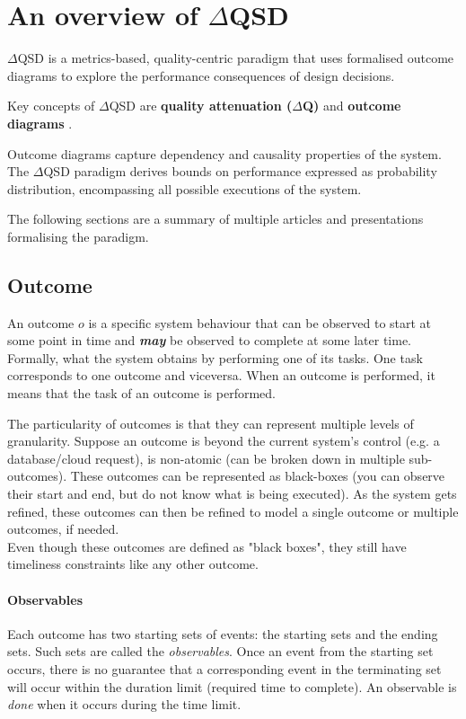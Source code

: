 \section{An overview of $\Delta$QSD}
    $\Delta$QSD is a metrics-based, quality-centric paradigm that uses formalised outcome diagrams to explore the performance consequences of design decisions. \cite{myo}
    
    Key concepts of $\Delta$QSD are \textbf{quality attenuation ($\Delta$Q)} and \textbf{outcome diagrams} \cite{dq-tut}.

    Outcome diagrams capture dependency and causality properties of the system. The $\Delta$QSD paradigm derives bounds on performance expressed as probability distribution, encompassing all possible executions of the system. \cite{myo}
 
    The following sections are a summary of multiple articles and presentations formalising the paradigm.
     
 \subsection{Outcome}
           An outcome $o$ is a specific system behaviour that can be observed to start at some point in time and \textit{\textbf{may}} be observed to complete at some later time. \cite{dq-br}
        Formally, what the system obtains by performing one of its tasks. One task corresponds to one outcome and viceversa. When an outcome is performed, it means that the task of an outcome is performed.
     
        The particularity of outcomes is that they can represent multiple levels of granularity. Suppose an outcome is beyond the current system's control (e.g. a database/cloud request), is non-atomic (can be broken down in multiple sub-outcomes). These outcomes can be represented as black-boxes (you can observe their start and end, but do not know what is being executed). As the system gets refined, these outcomes can then be refined to model a single outcome or multiple outcomes, if needed. \\ 
        Even though these outcomes are defined as "black boxes", they still have timeliness constraints like any other outcome. \cite{myo}

     \paragraph{Observables}
    Each outcome has two starting sets of events: the starting sets and the ending sets. Such sets are called the \textit{observables}. Once an event from the starting set occurs, there is no guarantee that a corresponding event in the terminating set will occur within the duration limit (required time to complete). An observable is \textit{done} when it occurs during the time limit. \cite{art}

